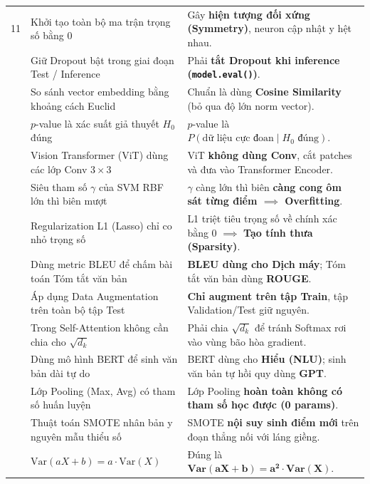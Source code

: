 \documentclass[10pt,a4paper]{article}
\begin{document}
\begin{xltabular}{\textwidth}{lp{6.2cm}X}
11 & Khởi tạo toàn bộ ma trận trọng số bằng $0$ & Gây \textbf{hiện tượng đối xứng (Symmetry)}, neuron cập nhật y hệt nhau. \\  & Giữ Dropout bật trong giai đoạn Test / Inference & Phải \textbf{tắt Dropout khi inference (\texttt{model.eval()})}. \\  & So sánh vector embedding bằng khoảng cách Euclid & Chuẩn là dùng \textbf{Cosine Similarity} (bỏ qua độ lớn norm vector). \\  & $p$-value là xác suất giả thuyết $H_0$ đúng & $p$-value là $P(\text{dữ liệu cực đoan} \mid H_0 \text{ đúng})$. \\  & Vision Transformer (ViT) dùng các lớp Conv $3 \times 3$ & ViT \textbf{không dùng Conv}, cắt patches và đưa vào Transformer Encoder. \\  & Siêu tham số $\gamma$ của SVM RBF lớn thì biên mượt & $\gamma$ càng lớn thì biên \textbf{càng cong ôm sát từng điểm $\implies$ Overfitting}. \\  & Regularization L1 (Lasso) chỉ co nhỏ trọng số & L1 triệt tiêu trọng số về chính xác bằng 0 $\implies$ \textbf{Tạo tính thưa (Sparsity)}. \\  & Dùng metric BLEU để chấm bài toán Tóm tắt văn bản & \textbf{BLEU dùng cho Dịch máy}; Tóm tắt văn bản dùng \textbf{ROUGE}. \\  & Áp dụng Data Augmentation trên toàn bộ tập Test & \textbf{Chỉ augment trên tập Train}, tập Validation/Test giữ nguyên. \\  & Trong Self-Attention không cần chia cho $\sqrt{d_k}$ & Phải chia $\sqrt{d_k}$ để tránh Softmax rơi vào vùng bão hòa gradient. \\  & Dùng mô hình BERT để sinh văn bản dài tự do & BERT dùng cho \textbf{Hiểu (NLU)}; sinh văn bản tự hồi quy dùng \textbf{GPT}. \\  & Lớp Pooling (Max, Avg) có tham số huấn luyện & Lớp Pooling \textbf{hoàn toàn không có tham số học được (0 params)}. \\  & Thuật toán SMOTE nhân bản y nguyên mẫu thiểu số & SMOTE \textbf{nội suy sinh điểm mới} trên đoạn thẳng nối với láng giềng. \\  & $\text{Var}(aX + b) = a \cdot \text{Var}(X)$ & Đúng là $\mathbf{\text{Var}(aX + b) = a^2 \cdot \text{Var}(X)}$. \\
\end{xltabular}
\end{document}
